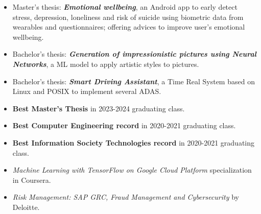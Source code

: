 \documentclass[10pt,a4paper,ragged2e,withhyper]{altacv}
\begin{document}
            
            \begin{itemize}
                \item Master's thesis: \textit{\textbf{Emotional wellbeing}}, an Android app to early detect stress, depression, loneliness and risk of suicide using biometric data from wearables and questionnaires; offering advices to improve user's emotional wellbeing.
            \end{itemize}
        \smallskip
        
        
            \begin{itemize}
                \item Bachelor's thesis: \textit{\textbf{Generation of impressionistic pictures using Neural Networks}}, a ML model to apply artistic styles to pictures.
                \item Bachelor's thesis: \textit{\textbf{Smart Driving Assistant}}, a Time Real System based on Linux and POSIX to implement several ADAS.
            \end{itemize}
        \smallskip
    
        \begin{itemize}
            \item \textbf{Best Master's Thesis} in 2023-2024 graduating class.
            \item \textbf{Best Computer Engineering record} in 2020-2021 graduating class.
            \item \textbf{Best Information Society Technologies record} in 2020-2021 graduating class.
        \end{itemize}
    
    
        \begin{itemize}
            \item \textit{Machine Learning with TensorFlow on Google Cloud Platform} specialization in Coursera.
            \item \textit{Risk Management: SAP GRC, Fraud Management and Cybersecurity} by Deloitte.
        \end{itemize}
        
\end{document}
